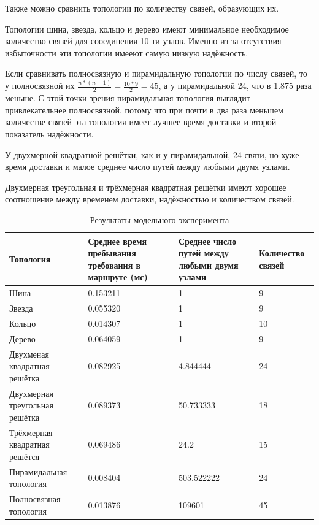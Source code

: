 \documentclass[oneside, final, 14pt, a4paper]{extreport}
\begin{document}
Также можно сравнить топологии по количеству связей, образующих их.

Топологии шина, звезда, кольцо и дерево имеют минимальное необходимое количество связей для сооединения 10-ти узлов. Именно из-за отсутствия избыточности эти топологии имееют самую низкую надёжность.

Если сравнивать полносвязную и пирамидальную топологии по числу связей, то у полносвязной их \( \frac{ n * (n - 1) }{2} = \frac{10 * 9}{2} = 45 \), а у пирамидальной 24, что в 1.875 раза меньше. С этой точки зрения пирамидальная топология выглядит привлекательнее полносвязной, потому что при почти в два раза меньшем количестве связей эта топология имеет лучшее время доставки и второй показатель надёжности.

У двухмерной квадратной решётки, как и у пирамидальной, 24 связи, но хуже время доставки и малое среднее число путей между любыми двумя узлами. 

Двухмерная треугольная и трёхмерная квадратная решётки имеют хорошее соотношение между временем доставки, надёжностью и количеством связей.

\begin{table}[h!]
	\begin{tabular}{|p{}|p{}|p{}|p{}|}
	\hline Топология & Среднее время пребывания требования в маршруте (мс) & Среднее число путей между любыми двумя узлами & Количество связей \\
	\hline Шина  & 0.153211 & 1 & 9 \\
	\hline Звезда & 0.055320 & 1 & 9 \\
	\hline Кольцо & 0.014307 & 1 & 10 \\
	\hline Дерево & 0.064059 & 1 & 9 \\
	\hline Двухменая квадратная решётка & 0.082925 & 4.844444 & 24 \\
	\hline Двухмерная треугольная решётка & 0.089373 & 50.733333 & 18 \\
	\hline Трёхмерная квадратная решётся & 0.069486 & 24.2 & 15 \\
	\hline Пирамидальная топология & 0.008404 & 503.522222 & 24 \\
	\hline Полносвязная топология & 0.013876 & 109601 & 45 \\
	\hline
	\end{tabular}
	
	\caption{Результаты модельного эксперимента}
	\label{tab:modeling_result}
\end{table}
\end{document}
